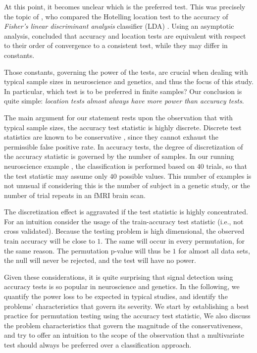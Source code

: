 \documentclass[12pt,a4paper]{article}
\begin{document}
At this point, it becomes unclear which is the preferred test. 
This was precisely the topic of \cite{ramdas_classification_2016}, who compared the Hotelling location test to the accuracy of \emph{Fisher's linear discriminant analysis} classifier (LDA) \citep{hastie_elements_2003-1}. 
Using an asymptotic analysis, \cite{ramdas_classification_2016} concluded that accuracy and location tests are equivalent with respect to their order of convergence to a consistent test, while they may differ in constants. 

Those constants, governing the power of the tests, are crucial when dealing with typical sample sizes in neuroscience and genetics, and thus the focus of this study. 
In particular, which test is to be preferred in finite samples? 
Our conclusion is quite simple: {\em location tests almost always have more power than accuracy tests}.

The main argument for our statement rests upon the observation that with typical sample sizes, the accuracy test statistic is highly discrete. 
Discrete test statistics are known to be conservative \citep{hemerik_exact_2014}, since they cannot exhaust the permissible false positive rate. 
In accuracy tests, the degree of discretization of the accuracy statistic is governed by the number of samples. 
In our running neuroscience example \citep{gilron_quantifying_2016}, the classification is performed based on $40$ trials, so that the test statistic may assume only $40$ possible values. 
This number of examples is not unusual if considering this is the number of subject in a genetic study, or the number of trial repeats in an fMRI brain scan. 

The discretization effect is aggravated if the test statistic is highly concentrated. 
For an intuition consider the usage of the train-accuracy test statistic (i.e., not cross validated).
Because the testing problem is high dimensional, the observed train accuracy will be close to $1$. 
The same will occur in every permutation, for the same reason. 
The permutation p-value will thus be $1$ for almost all data sets, the null will never be rejected, and the test will have no power. 

Given these considerations, it is quite surprising that signal detection using accuracy tests is so popular in neuroscience and genetics. 
In the following, we quantify the power loss to be expected in typical studies, and identify the problems' characteristics that govern its severity. 
We start by establishing a best practice for permutation testing using the accuracy test statistic, 
We also discuss the problem characteristics that govern the magnitude of the conservativeness, and try to offer an intuition to the scope of the observation that a multivariate test should always be preferred over a classification approach. 
\end{document}
